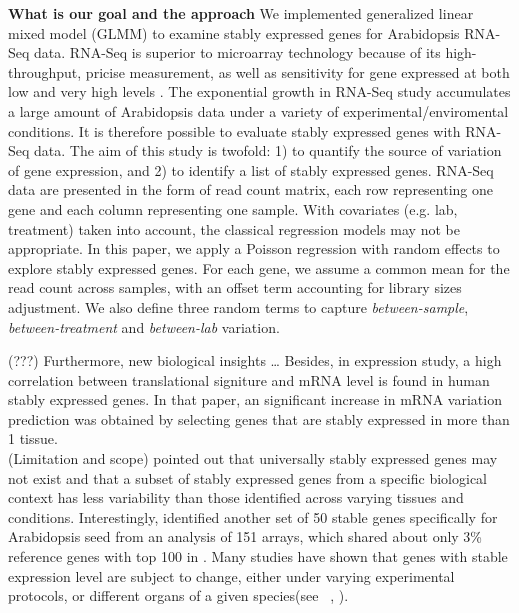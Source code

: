 \documentclass[11pt, a4paper]{article}
\begin{document}
\textbf{What is our goal and the approach} 
 We implemented generalized linear mixed model (GLMM) \citep{mccullagh1989generalized} to examine stably expressed genes for Arabidopsis RNA-Seq data. RNA-Seq is superior to microarray technology because of its high-throughput, pricise measurement, as well as sensitivity for gene expressed at both low and very high levels \citep{wang2009rna}. The exponential growth in RNA-Seq study accumulates a large amount of Arabidopsis
data under a variety of experimental/enviromental conditions. It is therefore possible to evaluate stably expressed genes with RNA-Seq data. The aim of this study is twofold: 1) to quantify the source of variation of gene expression, and 2) to identify a list of stably expressed genes. RNA-Seq data are presented in the form of read count matrix, each row representing one gene and each column representing one sample. With covariates (e.g. lab, treatment) taken into account,  the classical regression models may not be appropriate. In this paper, we apply a Poisson regression with random effects to explore stably expressed genes. For each gene,  we assume a common mean for the read count across samples, with an offset term accounting for library sizes adjustment. We also define three random terms to capture \textit{between-sample}, \textit{between-treatment} and \textit{between-lab} variation.

(???) Furthermore, new biological insights \dots
Besides, in expression
study, a high correlation between translational signiture and mRNA level is
found in human stably expressed genes\citep{line2013translational}. In that
paper, an significant increase in mRNA variation prediction was obtained by
selecting genes that are stably expressed in more than 1 tissue.\\

(Limitation and scope)
\cite{hruz2011refgenes} pointed out that
universally stably expressed genes may not exist and that a subset of stably
expressed genes from a specific biological context has less variability than
those identified across varying tissues and conditions. 
Interestingly, \cite{dekkers2012identification} identified another set of 50
stable genes specifically for Arabidopsis seed from an analysis of 151 arrays,
which shared about only 3\% reference genes with top 100 in
\cite{czechowski2005genome}.  
Many studies have shown that genes with stable expression level are subject to
change, either under varying experimental protocols, or different organs of a
given species(see ~\cite{reid2006optimized}, \cite{hong2010identification}).  
\end{document}
